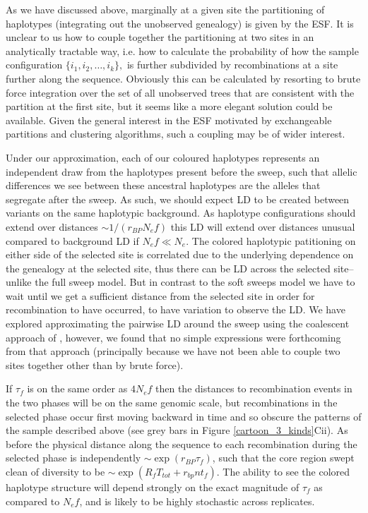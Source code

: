 \documentclass[a4paper,10pt]{article}
\begin{document}
As we have discussed above, marginally at a given site the partitioning of haplotypes (integrating out the unobserved genealogy) is given by the ESF. It is unclear to us how to couple together the partitioning at two sites in an analytically tractable way, i.e. how to calculate the probability of  how the sample configuration $ \{i_1,i_2,\dots,i_k\},$ is further subdivided by recombinations at a site further along the sequence. Obviously this can be calculated by resorting to brute force integration over the set of all unobserved trees that are consistent with the partition at the first site, but it seems like a more elegant solution could be available. Given the general interest in the ESF motivated by exchangeable partitions and clustering algorithms, such a coupling may be of wider interest.
 
Under our approximation, each of our coloured haplotypes represents an independent draw from the haplotypes present before the sweep, such that allelic differences we see between these ancestral haplotypes are the alleles that segregate after the sweep. As such, we should expect LD to be created between variants on the same haplotypic background. As haplotype configurations should extend over distances $\sim 1/(r_{BP} N_e f)$ this LD will extend over distances unusual compared to background LD if $N_e f \ll N_e$. The colored haplotypic patitioning on either side of the selected site is correlated due to the underlying dependence on the genealogy at the selected site, thus there can be LD across the selected site--unlike the full sweep model. But in contrast to the soft sweeps model we have to wait until we get a sufficient distance from the selected site in order for recombination to have occurred, to have variation to observe the LD. We have explored approximating the pairwise LD around the sweep using the coalescent approach of \citet{McVean:2006ke}, however, we found that no simple expressions were forthcoming from that approach (principally because we have not been able to couple two sites together other than by brute force).

If $\tau_{f}$ is on the same order as $4N_e f$ then the distances to recombination events in the two phases will be on the same genomic scale, but recombinations in the selected phase occur first moving backward in time and so obscure the patterns of the sample described above (see grey bars in Figure \ref{cartoon_3_kinds}Cii). As before the physical distance along the sequence to each recombination during the selected phase is independently $\sim \exp(r_{BP} \tau_{f}) $, such that the core region swept clean of diversity to be  $\sim \exp \left( R_f T_{tot} + r_{bp} n t_{f} \right)$. The ability to see the colored haplotype structure will depend strongly on the exact magnitude of $\tau_{f}$ as compared to $N_e f$, and is likely to be highly stochastic across replicates.
\end{document}
